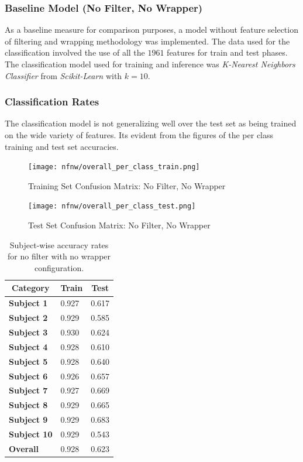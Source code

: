 \documentclass[12pt,twoside,a4paper]{article}
\begin{document}
\subsubsection{Baseline Model (No Filter, No Wrapper)}
As a baseline measure for comparison purposes, a model without feature selection of filtering and wrapping methodology was implemented. The data used for the classification involved the use of all the $1961$ features for train and test phases. The classification model used for training and inference was \textit{K-Nearest Neighbors Classifier} from \textit{Scikit-Learn} with $k=10$.

\subsubsection*{Classification Rates}
The classification model is not generalizing well over the test set as being trained on the wide variety of features. Its evident from the figures of the per class training and test set accuracies.
\begin{figure}[H]
    \centering
    \texttt{[image: nfnw/overall\_per\_class\_train.png]}
    \caption{Training Set Confusion Matrix: No Filter, No Wrapper}
    \label{fig: NFW1}
\end{figure}

\begin{figure}[H]
    \centering
    \texttt{[image: nfnw/overall\_per\_class\_test.png]}
    \caption{Test Set Confusion Matrix: No Filter, No Wrapper}
    \label{fig: NFW2}
\end{figure}


\begin{table}[H]
\centering
\begin{tabular}{|l|l|l|}
\hline
\multicolumn{1}{|c|}{\textbf{Category}} & \multicolumn{1}{c|}{\textbf{Train}} & \multicolumn{1}{c|}{\textbf{Test}} \\ \hline
\textbf{Subject 1}  & 0.927 & 0.617 \\ \hline
\textbf{Subject 2}  & 0.929 & 0.585 \\ \hline
\textbf{Subject 3}  & 0.930 & 0.624 \\ \hline
\textbf{Subject 4}  & 0.928 & 0.610 \\ \hline
\textbf{Subject 5}  & 0.928 & 0.640 \\ \hline
\textbf{Subject 6}  & 0.926 & 0.657 \\ \hline
\textbf{Subject 7}  & 0.927 & 0.669 \\ \hline
\textbf{Subject 8}  & 0.929 & 0.665 \\ \hline
\textbf{Subject 9}  & 0.929 & 0.683 \\ \hline
\textbf{Subject 10} & 0.929 & 0.543 \\ \hline
\textbf{Overall}    & 0.928 & 0.623 \\ \hline
\end{tabular}
\caption{Subject-wise accuracy rates for no filter with no wrapper configuration.}
\label{tab:NFNWT}
\end{table}
\end{document}
